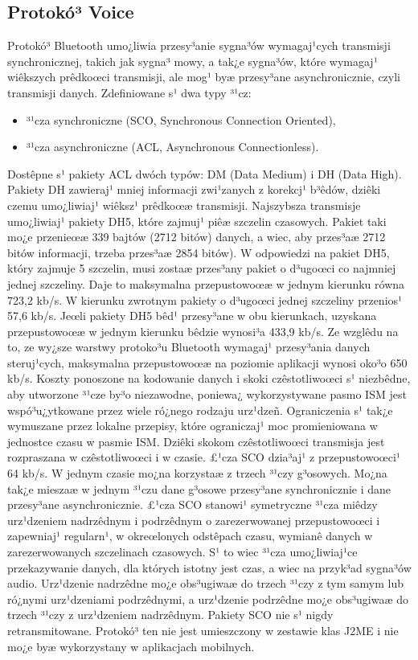\subsection{Protokó³ Voice}
\label{sec:Protokol Voice}

Protokó³ Bluetooth umo¿liwia przesy³anie sygna³ów wymagaj¹cych
transmisji synchronicznej, takich jak sygna³ mowy, a tak¿e sygna³ów,
które wymagaj¹ wiêkszych prêdkoœci transmisji, ale mog¹ byæ
przesy³ane asynchronicznie, czyli transmisji danych. Zdefiniowane s¹
dwa typy ³¹cz:
\begin{itemize}
\item  ³¹cza synchroniczne (SCO, Synchronous Connection Oriented),
\item  ³¹cza asynchroniczne (ACL, Asynchronous Connectionless).
\end{itemize}
Dostêpne s¹ pakiety ACL dwóch typów: DM (Data Medium) i DH (Data
High). Pakiety DH zawieraj¹ mniej informacji zwi¹zanych z korekcj¹
b³êdów, dziêki czemu umo¿liwiaj¹ wiêksz¹ prêdkoœæ transmisji.
Najszybsza transmisje umo¿liwiaj¹ pakiety DH5, które zajmuj¹ piêæ
szczelin czasowych. Pakiet taki mo¿e przenieœæ 339 bajtów (2712
bitów) danych, a wiec, aby przes³aæ 2712 bitów informacji, trzeba
przes³aæ 2854 bitów). W odpowiedzi na pakiet DH5, który zajmuje 5
szczelin, musi zostaæ przes³any pakiet o d³ugoœci co najmniej jednej
szczeliny. Daje to maksymalna przepustowoœæ w jednym kierunku równa
723,2 kb/s. W kierunku zwrotnym pakiety o d³ugoœci jednej szczeliny
przenios¹ 57,6 kb/s. Jeœli pakiety DH5 bêd¹ przesy³ane w obu
kierunkach, uzyskana przepustowoœæ w jednym kierunku bêdzie wynosi³a
433,9 kb/s. Ze wzglêdu na to, ze wy¿sze warstwy protoko³u Bluetooth
wymagaj¹ przesy³ania danych steruj¹cych, maksymalna przepustowoœæ na
poziomie aplikacji wynosi oko³o 650 kb/s. Koszty ponoszone na
kodowanie danych i skoki czêstotliwoœci s¹ niezbêdne, aby utworzone
³¹cze by³o niezawodne, poniewa¿ wykorzystywane pasmo ISM jest
wspó³u¿ytkowane przez wiele ró¿nego rodzaju urz¹dzeñ. Ograniczenia
s¹ tak¿e wymuszane przez lokalne przepisy, które ograniczaj¹ moc
promieniowana w jednostce czasu w pasmie ISM. Dziêki skokom
czêstotliwoœci transmisja jest rozpraszana w czêstotliwoœci i w
czasie. £¹cza SCO dzia³aj¹ z przepustowoœci¹ 64 kb/s. W jednym
czasie mo¿na korzystaæ z trzech ³¹czy g³osowych. Mo¿na tak¿e mieszaæ
w jednym ³¹czu dane g³osowe przesy³ane synchronicznie i dane
przesy³ane asynchronicznie. £¹cza SCO stanowi¹ symetryczne ³¹cza
miêdzy urz¹dzeniem nadrzêdnym i podrzêdnym o zarezerwowanej
przepustowoœci i zapewniaj¹ regularn¹, w okreœlonych odstêpach
czasu, wymianê danych w zarezerwowanych szczelinach czasowych. S¹ to
wiec ³¹cza umo¿liwiaj¹ce przekazywanie danych, dla których istotny
jest czas, a wiec na przyk³ad sygna³ów audio. Urz¹dzenie nadrzêdne
mo¿e obs³ugiwaæ do trzech ³¹czy z tym samym lub ró¿nymi urz¹dzeniami
podrzêdnymi, a urz¹dzenie podrzêdne mo¿e obs³ugiwaæ do trzech ³¹czy
z urz¹dzeniem nadrzêdnym. Pakiety SCO nie s¹ nigdy retransmitowane.
Protokó³ ten nie jest umieszczony w zestawie klas J2ME i nie mo¿e
byæ wykorzystany w aplikacjach mobilnych.

